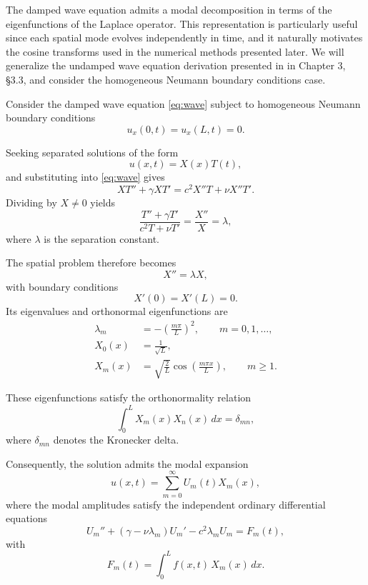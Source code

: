 \documentclass{Configuration_Files/PoliMi3i_thesis}
\begin{document}
The damped wave equation admits a modal decomposition in terms of the eigenfunctions of the Laplace operator.
This representation is particularly useful since each spatial mode evolves independently in time, and it naturally motivates the cosine transforms used in the numerical methods presented later. We will generalize the undamped wave equation derivation presented in \cite{asmar_partial_2005} in Chapter 3, \S3.3, and consider the homogeneous Neumann boundary conditions case.

Consider the damped wave equation \eqref{eq:wave} subject to homogeneous Neumann boundary conditions
\begin{equation*}
u_x(0,t)=u_x(L,t)=0.
\end{equation*}

Seeking separated solutions of the form
\begin{equation*}
u(x,t)=X(x)T(t),
\end{equation*}
and substituting into \eqref{eq:wave} gives
\begin{equation*}
XT''
+\gamma XT'
=
c^2X''T
+\nu X''T'.
\end{equation*}
Dividing by $X \neq 0$ yields
\begin{equation*}
\frac{T''+\gamma T'}{c^2T+\nu T'}
=
\frac{X''}{X}
=
\lambda,
\end{equation*}
where $\lambda$ is the separation constant.

The spatial problem therefore becomes
\begin{equation*}
X''=\lambda X,
\end{equation*}
with boundary conditions
\begin{equation*}
X'(0)=X'(L)=0.
\end{equation*}
Its eigenvalues and orthonormal eigenfunctions are
\begin{align}
\lambda_m
&=
-\left(\frac{m\pi}{L}\right)^2, \label{eq:eigenvalues}
\qquad
m=0,1,\ldots,
\\
X_0(x)
&=
\frac1{\sqrt L},
\\
X_m(x)
&=
\sqrt{\frac2L}
\cos\!\left(\frac{m\pi x}{L}\right),
\qquad
m\ge1.
\end{align}

These eigenfunctions satisfy the orthonormality relation
\begin{equation*}
\int_0^L
X_m(x)X_n(x)\,dx
=
\delta_{mn},
\end{equation*}
where $\delta_{mn}$ denotes the Kronecker delta.

Consequently, the solution admits the modal expansion
\begin{equation*}
u(x,t)
=
\sum_{m=0}^{\infty}
U_m(t)X_m(x),
\end{equation*}
where the modal amplitudes satisfy the independent ordinary differential equations
\begin{equation} \label{eq:modal_ode}
U_m''
+
\left(
\gamma
-
\nu\lambda_m
\right)
U_m'
-
c^2\lambda_mU_m
=
F_m(t),
\end{equation}
with
\begin{equation*}
F_m(t)
=
\int_0^L
f(x,t)\,
X_m(x)\,dx.
\end{equation*}
\end{document}
